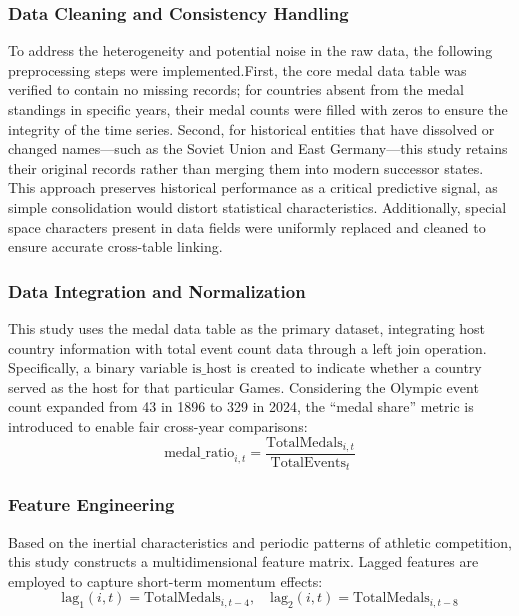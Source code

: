 \documentclass{mcmthesis}
\begin{document}
\subsubsection{Data Cleaning and Consistency Handling}

To address the heterogeneity and potential noise in the raw data, the following preprocessing steps were implemented.First, the core medal data table was verified to contain no missing records; for countries absent from the medal standings in specific years, their medal counts were filled with zeros to ensure the integrity of the time series. Second, for historical entities that have dissolved or changed names—such as the Soviet Union and East Germany—this study retains their original records rather than merging them into modern successor states. This approach preserves historical performance as a critical predictive signal, as simple consolidation would distort statistical characteristics. Additionally, special space characters present in data fields were uniformly replaced and cleaned to ensure accurate cross-table linking.



\subsubsection{Data Integration and Normalization}

This study uses the medal data table as the primary dataset, integrating host country information with total event count data through a left join operation. Specifically, a binary variable $\text{is\_host}$ is created to indicate whether a country served as the host for that particular Games. Considering the Olympic event count expanded from 43 in 1896 to 329 in 2024, the “medal share” metric is introduced to enable fair cross-year comparisons:
\[
 \text{medal\_ratio}_{i,t} = \frac{\text{TotalMedals}_{i,t}}{\text{TotalEvents}_t}
    \]

\subsubsection{Feature Engineering}

Based on the inertial characteristics and periodic patterns of athletic competition, this study constructs a multidimensional feature matrix. Lagged features are employed to capture short-term momentum effects:
\begin{equation}
\text{lag}_1(i,t) = \text{TotalMedals}_{i,t-4}, \quad \text{lag}_2(i,t) = \text{TotalMedals}_{i,t-8}
\end{equation}
\end{document}
